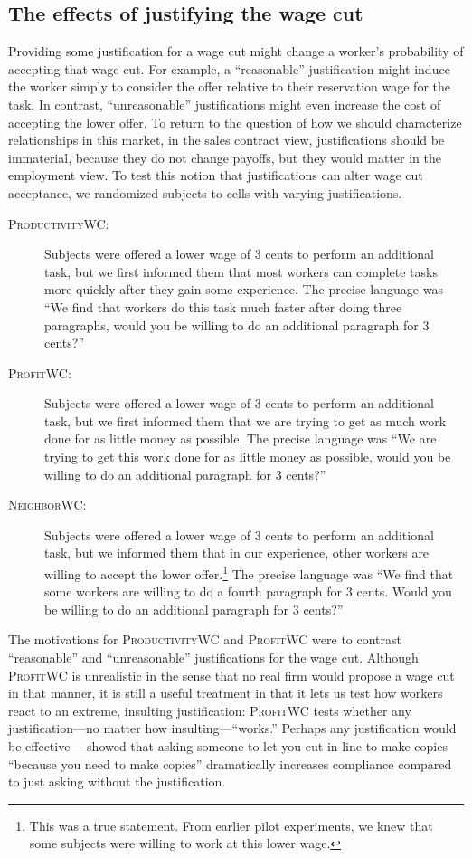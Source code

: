 \documentclass[11pt]{article}
\begin{document}
\subsection{The effects of justifying the wage cut}
Providing some justification for a wage cut might change a worker's probability of accepting that wage cut. 
For example, a ``reasonable'' justification might induce the worker simply to consider the offer relative to their reservation wage for the task. 
In contrast, ``unreasonable'' justifications might even increase the cost of accepting the lower offer.
To return to the question of how we should characterize relationships in this market, in the sales contract view, justifications should be immaterial, because they do not change payoffs, but they would matter in the employment view. 
To test this notion that justifications can alter wage cut acceptance, we randomized subjects to cells with varying justifications. 
\begin{description} 
\item[\textsc{ProductivityWC}:] Subjects were offered a lower wage of 3 cents
  to perform an additional task, but we first informed them that most
  workers can complete tasks more quickly after they gain some experience.
  The precise language was ``We find that workers do this task much faster after doing three
paragraphs, would you be willing to do an additional paragraph for 3
cents?''
\item[\textsc{ProfitWC}:] Subjects were offered a lower wage of 3 cents to
  perform an additional task, but we first informed them that we are trying to
  get as much work done for as little money as possible. The precise language was ``We are trying to get this work done for as little money as
possible, would you be willing to do an additional paragraph for 3
cents?''
\item[\textsc{NeighborWC}:] Subjects were offered a lower wage of 3 cents to
  perform an additional task, but we informed them that in our
  experience, other workers are willing to accept the lower
  offer.\footnote{This was a true statement. From earlier pilot experiments,
    we knew that some subjects were willing to work at this lower wage.} The precise language was ``We find that some workers are willing to do a fourth paragraph
for 3 cents. Would you be willing to do an additional paragraph for 3
cents?'' 
\end{description}

The motivations for \textsc{ProductivityWC} and \textsc{ProfitWC} were to contrast ``reasonable'' and ``unreasonable'' justifications for the wage cut.
Although \textsc{ProfitWC} is unrealistic in the sense that no real firm would propose a wage cut in that manner, it is still a useful treatment in that it lets us test how workers react to an extreme, insulting justification:
\textsc{ProfitWC} tests whether any justification---no matter how insulting---``works.''
Perhaps any justification would be effective---\cite{langer1978mot} showed that asking someone to let you cut in line to make copies ``because you need to make copies'' dramatically increases compliance compared to just asking without the justification.
\end{document}
